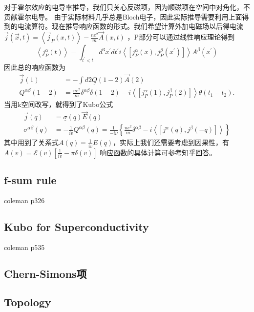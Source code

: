 \documentclass[10pt,openany]{book}
\theoremstyle{thmstyle} %
\theoremstyle{defstyle} %
\theoremstyle{prostyle} %
\begin{document}
对于霍尔效应的电导率推导，我们只关心反磁项，因为顺磁项在空间中对角化，不贡献霍尔电导。
由于实际材料几乎总是Bloch电子，因此实际推导需要利用上面得到的电流算符。现在推导响应函数的形式。我们希望计算外加电磁场以后得电流$ \vec{j}(\vec{x}, t)=\left\langle\vec{j}_P(x, t)\right\rangle-\frac{n e^2}{m} \vec{A}(x, t) $ ，P部分可以通过线性响应理论得到
\begin{equation}
  \left\langle j_P^\alpha(t)\right\rangle=\int_{t^{\prime}<t} d^3 x^{\prime} d t^{\prime} i\left\langle\left[j_P^\alpha(x), j_P^\beta\left(x^{\prime}\right)\right]\right\rangle A^\beta\left(x^{\prime}\right)
\end{equation}
因此总的响应函数为
\begin{equation}
  \begin{aligned}
    \vec{j}(1) & =-\int d 2 \underline{Q}(1-2) \vec{A}(2) \\
    Q^{\alpha \beta}(1-2) & =\frac{n e^2}{m} \delta^{\alpha \beta} \delta(1-2)-i\left\langle\left[j_P^\alpha(1), j_P^\beta(2)\right]\right\rangle \theta\left(t_1-t_2\right) .
    \end{aligned}
\end{equation}
当用k空间改写，就得到了Kubo公式
\begin{equation}
  \begin{aligned}
    \vec{j}(q) & =\underline{\sigma}(q) \vec{E}(q) \\
    \sigma^{\alpha \beta}(q) & =-\frac{1}{i v} Q^{\alpha \beta}(q)=\frac{1}{-i \nu}\left\{\frac{n e^2}{m} \delta^{\alpha \beta}-i\left\langle\left[j^\alpha(q), j^\beta(-q)\right]\right\rangle\right\}
    \end{aligned}
\end{equation}
其中用到了关系式$ A(q)=\frac{1}{i v} E(q) $，实际上我们还需要考虑到因果性，有$ A(v)=\mathcal{E}(v)\left[\frac{1}{i v}-\pi \delta(v)\right] $  
响应函数的具体计算可参考\href{https://zhuanlan.zhihu.com/p/462520892}{知乎回答}。
\subsection{f-sum rule}
coleman p326
\subsection{Kubo for Superconductivity}
coleman p535
\subsection{Chern-Simons项}
\subsection{Topology}
\end{document}
